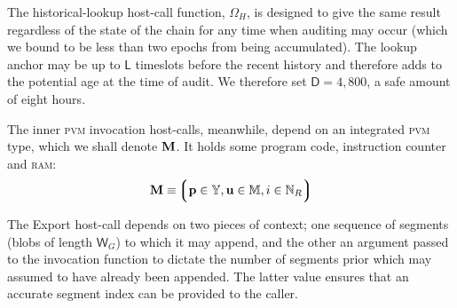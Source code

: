 The historical-lookup host-call function, $\Omega_H$, is designed to give the same result regardless of the state of the chain for any time when auditing may occur (which we bound to be less than two epochs from being accumulated). The lookup anchor may be up to $\mathsf{L}$ timeslots before the recent history and therefore adds to the potential age at the time of audit. We therefore set $\mathsf{D} = 4,800$, a safe amount of eight hours.

The inner \textsc{pvm} invocation host-calls, meanwhile, depend on an integrated \textsc{pvm} type, which we shall denote $\mathbf{M}$. It holds some program code, instruction counter and \textsc{ram}:
\begin{equation}
  \pvm \equiv \tuple{\isa{\mathbf{p}}{\Y}, \isa{\mathbf{u}}{\ram}, \isa{i}{\N_R}}
\end{equation}

The Export host-call depends on two pieces of context; one sequence of segments (blobs of length $\mathsf{W}_G$) to which it may append, and the other an argument passed to the invocation function to dictate the number of segments prior which may assumed to have already been appended. The latter value ensures that an accurate segment index can be provided to the caller.


